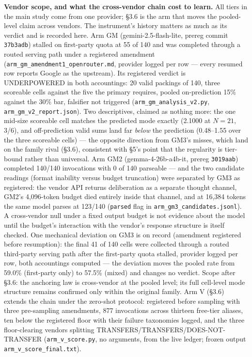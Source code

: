 \textbf{Vendor scope, and what the cross-vendor chain cost to learn.} All tiers in the main study
come from one provider; \S3.6 is the arm that moves the pooled-level claim across vendors.
The instrument's history matters as much as its verdict and is recorded here. Arm GM
(gemini-2.5-flash-lite, prereg commit \texttt{37b3adb}) stalled on first-party quota at 55 of 140
and was completed through a routed serving path under a registered amendment
(\texttt{arm\_gm\_amendment1\_openrouter.md}, provider logged per row --- every resumed row reports
Google as the upstream). Its registered verdict is UNDERPOWERED in both accountings: 20
valid packings of 140, three scoreable cells against the five the primary requires, pooled
on-prediction 15\% against the 30\% bar, falsifier not triggered
(\texttt{arm\_gm\_analysis\_v2.py}, \texttt{arm\_gm\_v2\_report.json}). Two descriptives, claimed as nothing
more: the one mid-size scoreable cell matches the predicted mode exactly (2.1000 at $N = 21$,
3/6), and off-prediction valid sums land far \emph{below} the prediction (0.48--1.55 over the three scoreable cells) --- the
opposite direction from GM3's misses, which land on the family rival (\S3.6), consistent
with \S5's point that the regularity is
tier-bound rather than universal. Arm GM2 (gemma-4-26b-a4b-it, prereg
\texttt{3019aab}) completed 140/140 invocations with 0 of 140 parseable --- and the two
candidate readings (format inability versus budget truncation) were separated by GM3 as
registered: the vendor API returns deliberation as a separate thought channel, GM2's
4,096-token budget died entirely inside that channel, and at 16,384 tokens the same model
parses at 123/140 (\texttt{parsed} flag in \texttt{arm\_gm3\_candidates.jsonl}). A cross-vendor null under a fixed output budget is not evidence about the
model until the budget's interaction with the vendor's response structure is itself checked.
One mechanical deviation on GM3 is on record (amendment registered before resumption): the
final 41 of 140 cells were collected through a routed third-party serving path after the
first-party quota stalled, provider logged per row, both accountings computed --- the
deviation moves the pooled rate from 59.0\% (first-party only) to 57.5\% (mixed) and changes
no verdict. Scope after \S3.6: the anchoring law is cross-vendor at the pooled level; its
full cell-level mode structure remains confirmed only within the original family. Arm V
(\S3.6) extends the chain under the zero-shot protocol: registered before sampling with three
pre-sampling amendments, 877 invocations across thirteen free-tier aliases, ten below the
registered floor with their failure taxonomies logged, and the three floor-clearing vendors
splitting TRANSFERS/TRANSFERS/DOES-NOT-TRANSFER (\texttt{arm\_v\_score.py}, no arguments, from the
live ledger; frozen output \texttt{arm\_v\_score\_final.txt}).

